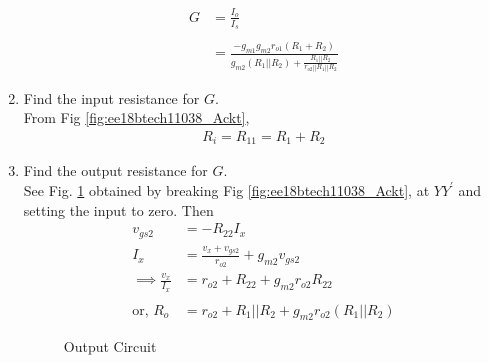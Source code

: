 \begin{enumerate}[label=\arabic*.,ref=\theenumi]
\begin{align}
    G &= \frac{I_{o}}{I_{s}}\\
\\
&=   \frac{-g_{m1}g_{m2}r_{o1}(R_{1} + R_{2})}{g_{m2}(R_{1}||R_{2}) + \frac{R_{1}||R_{2}}{r_{o2}||R_{1}||R_{2}}}
\end{align}
\item Find the input resistance  for $G$.
\\
\solution From Fig \ref{fig:ee18btech11038_Ackt}, 
\begin{align}
\label{eq:ee18btech11038_Ri}
    R_{i} = R_{11} = R_{1} + R_{2}
\end{align}
\item Find the output resistance for $G$.
\\
\solution See Fig. \ref{fig:ee18btech11038_outckt} obtained by breaking Fig \ref{fig:ee18btech11038_Ackt}, at $YY^{\prime}$ and setting the input to zero. Then
%
\begin{align}
v_{gs2} &= -R_{22}I_x
\\
I_x &= \frac{v_x + v_{gs2}}{r_{o2}}+g_{m2}v_{gs2}
\\
\implies 
    \frac{v_{x}}{I_{x}} &= r_{o2} + R_{22} + g_{m2}r_{o2}R_{22}\\
\label{eq:ee18btech11038_Ro}
\\
  \text{or, }R_{o} &=r_{o2} + R_{1}||R_{2} + g_{m2}r_{o2}(R_{1}||R_{2})
\end{align}
%
\begin{figure}[!ht]
	\begin{center}
		
		\resizebox{\columnwidth}{!}{}
	\end{center}
\caption{Output Circuit}
\label{fig:ee18btech11038_outckt}
\end{figure}


\end{enumerate}
